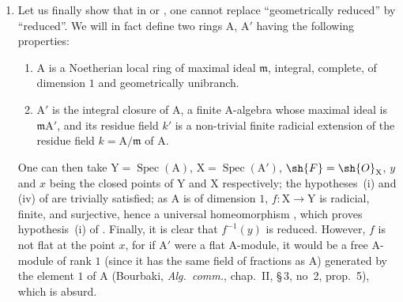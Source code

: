 \begin{remarks}[15.2.4]
\begin{enumerate}[label=(\roman*)]
The only point $x$ of $\mathrm{X}$ above the point $y$ corresponding to the maximal ideal $(s)+(t)$ corresponds to the maximal ideal $(u)$; but since the class $\bar{u}$ of $u$ in $\sh{O}_x/\mathfrak{m}_y\sh{O}_x$ satisfies $\bar{u}^2=0$, $f^{-1}(y)$ is not a reduced $\mathbf{k}(y)$-prescheme.
Here $f$ is a finite, surjective and radicial morphism, hence a universal homeomorphism , but it is not flat at the point $x$, for if $\sh{O}_x$ were a flat $\sh{O}_y$-module, it would be an $\sh{O}_y$-module
free of rank $1$ generated by the element $1$ of $\sh{O}_x$ (Bourbaki, \emph{Alg.\ comm.}, chap.~II, \S\,3, no~2, prop.~5), which is absurd.
  \item Let us finally show that in  or , one cannot replace ``geometrically reduced'' by ``reduced''.
We will in fact define two rings $\mathrm{A}$, $\mathrm{A}'$ having the following properties:
\begin{enumerate}[label=\arabic*)]
  \item $\mathrm{A}$ is a Noetherian local ring of maximal ideal $\mathfrak{m}$, integral, complete, of dimension $1$ and geometrically unibranch.
  \item $\mathrm{A}'$ is the integral closure of $\mathrm{A}$, a finite $\mathrm{A}$-algebra whose maximal ideal is $\mathfrak{m}\mathrm{A}'$, and its residue field $k'$ is a non-trivial finite radicial extension of the residue field $k=\mathrm{A}/\mathfrak{m}$ of $\mathrm{A}$.
\end{enumerate}
One can then take $\mathrm{Y}=\operatorname{Spec}(\mathrm{A})$, $\mathrm{X}=\operatorname{Spec}(\mathrm{A}')$, $\sh{F}=\sh{O}_\mathrm{X}$, $y$ and $x$ being the closed points of $\mathrm{Y}$ and $\mathrm{X}$ respectively; the hypotheses~(i) and (iv) of  are trivially satisfied; as $\mathrm{A}$ is of dimension $1$, $f:\mathrm{X}\to\mathrm{Y}$ is radicial, finite, and surjective, hence a universal homeomorphism , which proves hypothesis~(i) of .
Finally, it is clear that $f^{-1}(y)$ is reduced.
However, $f$ is not flat at the point $x$, for if $\mathrm{A}'$ were a flat $\mathrm{A}$-module, it would be a free $\mathrm{A}$-module of rank $1$ (since it has the same field of fractions as $\mathrm{A}$) generated by the element $1$ of $\mathrm{A}$ (Bourbaki, \emph{Alg.\ comm.}, chap.~II, \S\,3, no~2, prop.~5), which is absurd.


\end{enumerate}
\end{remarks}
